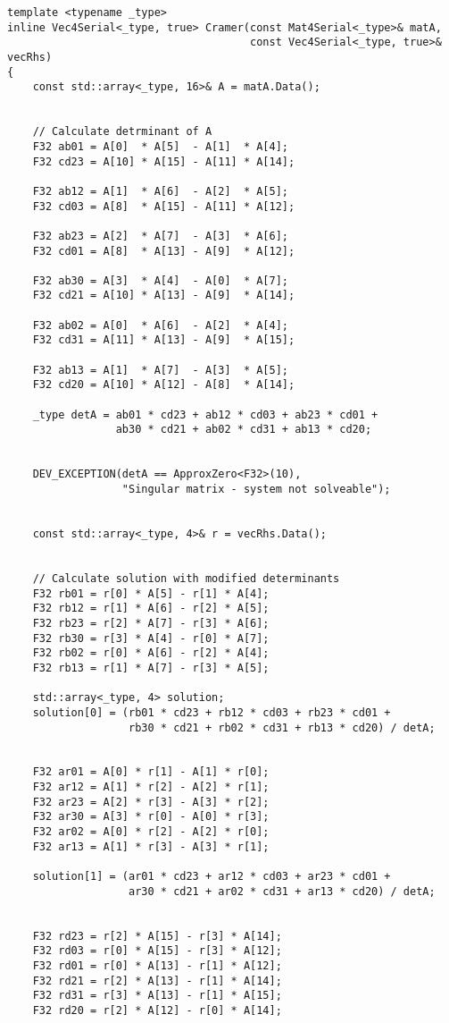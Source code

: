 \begin{verbatim}
template <typename _type>
inline Vec4Serial<_type, true> Cramer(const Mat4Serial<_type>& matA, 
                                      const Vec4Serial<_type, true>& vecRhs)
{
    const std::array<_type, 16>& A = matA.Data();


    // Calculate detrminant of A
    F32 ab01 = A[0]  * A[5]  - A[1]  * A[4];
    F32 cd23 = A[10] * A[15] - A[11] * A[14];

    F32 ab12 = A[1]  * A[6]  - A[2]  * A[5];
    F32 cd03 = A[8]  * A[15] - A[11] * A[12];

    F32 ab23 = A[2]  * A[7]  - A[3]  * A[6];
    F32 cd01 = A[8]  * A[13] - A[9]  * A[12];

    F32 ab30 = A[3]  * A[4]  - A[0]  * A[7];
    F32 cd21 = A[10] * A[13] - A[9]  * A[14];

    F32 ab02 = A[0]  * A[6]  - A[2]  * A[4];
    F32 cd31 = A[11] * A[13] - A[9]  * A[15];

    F32 ab13 = A[1]  * A[7]  - A[3]  * A[5];
    F32 cd20 = A[10] * A[12] - A[8]  * A[14];

    _type detA = ab01 * cd23 + ab12 * cd03 + ab23 * cd01 + 
                 ab30 * cd21 + ab02 * cd31 + ab13 * cd20;


    DEV_EXCEPTION(detA == ApproxZero<F32>(10), 
                  "Singular matrix - system not solveable");


    const std::array<_type, 4>& r = vecRhs.Data();


    // Calculate solution with modified determinants
    F32 rb01 = r[0] * A[5] - r[1] * A[4];
    F32 rb12 = r[1] * A[6] - r[2] * A[5];
    F32 rb23 = r[2] * A[7] - r[3] * A[6];
    F32 rb30 = r[3] * A[4] - r[0] * A[7];
    F32 rb02 = r[0] * A[6] - r[2] * A[4];
    F32 rb13 = r[1] * A[7] - r[3] * A[5];

    std::array<_type, 4> solution;
    solution[0] = (rb01 * cd23 + rb12 * cd03 + rb23 * cd01 + 
                   rb30 * cd21 + rb02 * cd31 + rb13 * cd20) / detA;


    F32 ar01 = A[0] * r[1] - A[1] * r[0];
    F32 ar12 = A[1] * r[2] - A[2] * r[1];
    F32 ar23 = A[2] * r[3] - A[3] * r[2];
    F32 ar30 = A[3] * r[0] - A[0] * r[3];
    F32 ar02 = A[0] * r[2] - A[2] * r[0];
    F32 ar13 = A[1] * r[3] - A[3] * r[1];

    solution[1] = (ar01 * cd23 + ar12 * cd03 + ar23 * cd01 + 
                   ar30 * cd21 + ar02 * cd31 + ar13 * cd20) / detA;


    F32 rd23 = r[2] * A[15] - r[3] * A[14];
    F32 rd03 = r[0] * A[15] - r[3] * A[12];
    F32 rd01 = r[0] * A[13] - r[1] * A[12];
    F32 rd21 = r[2] * A[13] - r[1] * A[14];
    F32 rd31 = r[3] * A[13] - r[1] * A[15];
    F32 rd20 = r[2] * A[12] - r[0] * A[14];


\end{verbatim}
